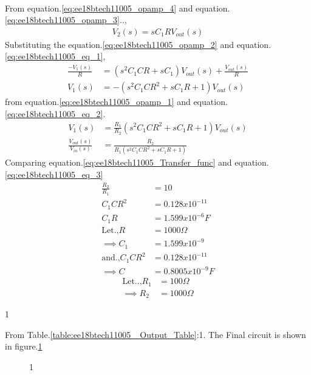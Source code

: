 \begin{enumerate}[label=\arabic*.,ref=\theenumi]
\begin{align}
\end{align}
From equation.\ref{eq:ee18btech11005_opamp_4} and equation. \ref{eq:ee18btech11005_opamp_3}..,
\begin{align}
    V_2(s) = sC_1RV_{out}(s) \label{eq:ee18btech11005_eq_1}
\end{align}
Substituting the equation.\ref{eq:ee18btech11005_opamp_2} and equation.\ref{eq:ee18btech11005_eq_1},
\begin{align}
    \frac{-V_1(s)}{R} &= (s^2C_1CR + sC_1)V_{out}(s) +\frac{V_{out}(s)}{R}\\
    V_1(s) &= -(s^2C_1CR^2+sC_1R+1)V_{out}(s)\label{eq:ee18btech11005_eq_2}
\end{align}
from equation.\ref{eq:ee18btech11005_opamp_1} and equation.\ref{eq:ee18btech11005_eq_2}.
\begin{align}
     V_1(s) &= \frac{R_1}{R_2}(s^2C_1CR^2+sC_1R+1)V_{out}(s)\\
    \frac{V_{out}(s)}{V_{in}(s)} &= \frac{R_2}{R_1(s^2C_1CR^2+sC_1R+1)} \label{eq:ee18btech11005_eq_3}
\end{align}
Comparing equation.\ref{eq:ee18btech11005_Transfer_func} and equation.\ref{eq:ee18btech11005_eq_3}
\begin{align}
    \frac{R_2}{R_1} &= 10 \\
    C_1CR^2 &= 0.128x10^{-11} \\
    C_1R &= 1.599x10^{-6} F\\
\text{Let.,} R &= 1000 \Omega\\
\implies C_1 &= 1.599x10^{-9} \\
 \text{and.,} C_1CR^2 &= 0.128x10^{-11} \\
 \implies C &= 0.8005x10^{-9} F
\end{align}
\begin{align}
\text{Let..,} R_1 &= 100\Omega\\
\implies R_2 &= 1000\Omega
\end{align}
\begin{table}[!ht]
\centering

\caption{1}
\label{table:ee18btech11005_ Output_Table}
\end{table}
From Table.\ref{table:ee18btech11005_ Output_Table}:1. The Final circuit is shown in figure.\ref{fig:Final_circuit}
\begin{figure}[!hbt]
	\begin{center}
			\resizebox{\columnwidth}{!}{}
	\end{center}
\caption{1}
\label{fig:Final_circuit}
\end{figure}
\end{enumerate}



